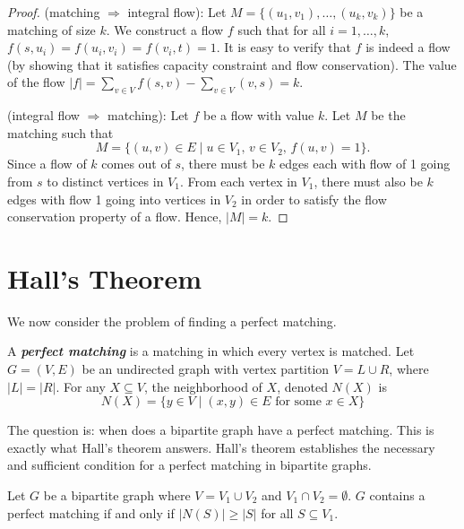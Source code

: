 \begin{proof}
    \hfill

    (matching $\Rightarrow$ integral flow): Let $M = \{(u_1,v_1),\ldots,(u_k,v_k)\}$ be a matching of size $k$. We construct a flow $f$ such that for all $i = 1,\ldots,k$, $f(s,u_i) = f(u_i,v_i) = f(v_i,t) = 1$. It is easy to verify that $f$ is indeed a flow (by showing that it satisfies capacity constraint and flow conservation). The value of the flow $|f| = \sum_{v \in V}f(s,v) - \sum_{v \in V}(v,s) = k$.

    (integral flow $\Rightarrow$ matching): Let $f$ be a flow with value $k$. Let $M$ be the matching such that
    $$
    M = \{(u,v) \in E \mid u \in V_1,\,v \in V_2,\,f(u,v) = 1\}.
    $$
    Since a flow of $k$ comes out of $s$, there must be $k$ edges each with flow of 1 going from $s$ to distinct vertices in $V_1$. From each vertex in $V_1$, there must also be $k$ edges with flow 1 going into vertices in $V_2$ in order to satisfy the flow conservation property of a flow. Hence, $|M| = k$.
\end{proof}

\section{Hall's Theorem}

We now consider the problem of finding a perfect matching.

\begin{definition} 
    A \textit{\textbf{perfect matching}} is a matching in which every vertex is matched. Let $G=(V,E)$ be an undirected graph with vertex partition $V = L \cup R$, where $|L|=|R|$. For any $X \subseteq V$, the neighborhood of $X$, denoted $N(X)$ is
    $$
    N(X) = \{y \in V \mid \text{$(x,y) \in E$ for some $x \in X$} \}
    $$
\end{definition}

The question is: when does a bipartite graph have a perfect matching. This is exactly what Hall's theorem answers. Hall's theorem establishes the necessary and sufficient condition for a perfect matching in bipartite graphs.

\begin{theorem} 
    Let $G$ be a bipartite graph where $V = V_1 \cup V_2$ and $V_1 \cap V_2 = \emptyset$. $G$ contains a perfect matching if and only if $|N(S)| \geq |S|$ for all $S \subseteq V_1$.
\end{theorem}

